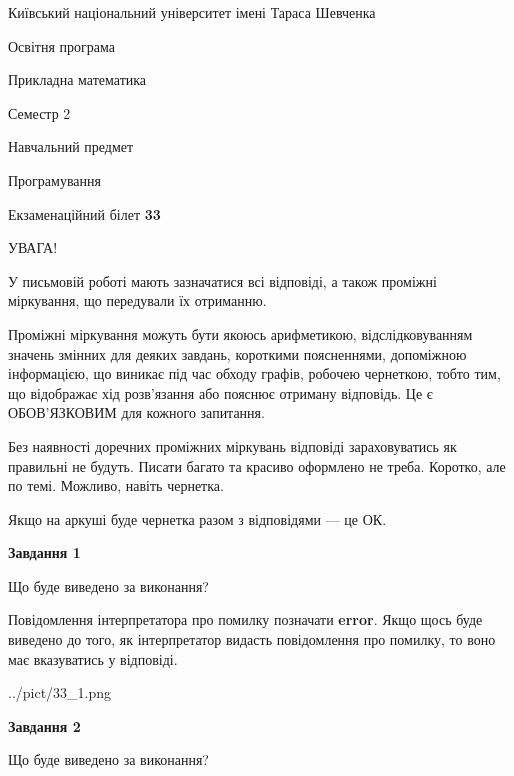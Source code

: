 \documentclass[12pt, ukrainian]{article}
\begin{document}
{{\begin {small}\par
{ \center  Київський національний університет імені Тараса Шевченка \par}
{\parbox {5 cm}{Освітня програма \hfill}{\parbox {7 cm}{Прикладна математика \hfill}}\parbox {6 cm}{\hfill Семестр 2}}\par
{\parbox {5 cm} {Навчальний предмет \hfill}\parbox {7 cm}{Програмування \hfill}\parbox {6cm}{\hfill}\par}\vspace{-7pt} \end{small}}{\center Екзаменаційний білет \No \textbf
{ 33 }\par}}
{
\begin {large}
УВАГА!

У письмовій роботі мають зазначатися всі відповіді, а також проміжні міркування, що передували їх отриманню.

Проміжні міркування можуть бути якоюсь арифметикою, відслідковуванням зна\-чень змінних для деяких завдань,
короткими поясненнями, допоміжною інформацією, що виникає під час обходу графів, робочею чернеткою,
тобто тим, що відображає хід розв’язання або пояснює отриману відповідь.
Це є ОБОВ’ЯЗКОВИМ для кожного запитання.

Без наявності доречних проміжних міркувань відповіді зараховуватись як правиль\-ні не будуть.
Писати багато та красиво оформлено не треба. Коротко, але по темі. Можли\-во, навіть чернетка.

Якщо на аркуші буде чернетка разом з відповідями --- це ОК.

\newpage

{\begin {center}\textbf{Завдання 1}\end {center}}\par
Що буде виведено за виконання?

Повідомлення інтерпретатора про помилку позначати \textbf{error}.
Якщо щось буде виведено до того, як інтерпретатор видасть повідомлення про помилку, 
то воно має вказуватись у відповіді. \par


\begin{center}
	{../pict/33_1.png}
\end{center}
\newpage

{\begin {center}\textbf{Завдання 2}\end {center}}\par
Що буде виведено за виконання?


\end{large}}
\end{document}
